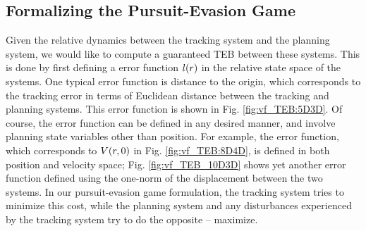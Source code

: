 \subsection{Formalizing the Pursuit-Evasion Game}
Given the relative dynamics between the tracking system and the planning system, we would like to compute a guaranteed TEB between these systems. 
This is done by first defining a error function $l(r)$ in the relative state space of the systems. 
One typical error function is distance to the origin, which corresponds to the tracking error in terms of Euclidean distance between the tracking and planning systems. 
This error function is shown in Fig. \ref{fig:vf_TEB:5D3D}. 
Of course, the error function can be defined in any desired manner, and involve planning state variables other than position.
For example, the error function, which corresponds to $V(r, 0)$ in Fig. \ref{fig:vf_TEB:8D4D}, is defined in both position and velocity space; Fig. \ref{fig:vf_TEB_10D3D} shows yet another error function defined using the one-norm of the displacement between the two systems. 
In our pursuit-evasion game formulation, the tracking system tries to minimize this cost, while the planning system and any disturbances experienced by the tracking system try to do the opposite -- maximize.
